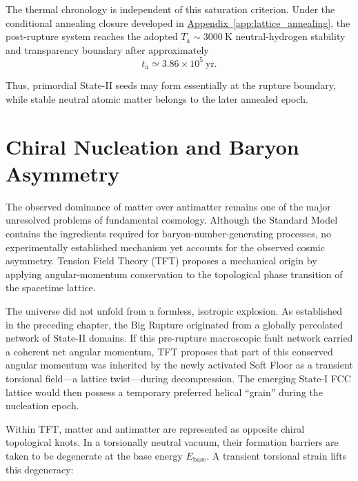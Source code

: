 The thermal chronology is independent of this saturation criterion. Under the conditional annealing closure developed in \hyperref[app:lattice_annealing]{Appendix~\ref*{app:lattice_annealing}}, the post-rupture system reaches the adopted \(T_{\mathrm a}\sim3000~\mathrm K\) neutral-hydrogen stability and transparency boundary after approximately
\begin{equation}
    t_{\mathrm a}
    \simeq
    3.86\times10^{5}\ \mathrm{yr}.
\end{equation}

Thus, primordial State-II seeds may form essentially at the rupture boundary, while stable neutral atomic matter belongs to the later annealed epoch.

\section{Chiral Nucleation and Baryon Asymmetry}

The observed dominance of matter over antimatter remains one of the major unresolved problems of fundamental cosmology. Although the Standard Model contains the ingredients required for baryon-number-generating processes, no experimentally established mechanism yet accounts for the observed cosmic asymmetry. Tension Field Theory (TFT) proposes a mechanical origin by applying angular-momentum conservation to the topological phase transition of the spacetime lattice.

The universe did not unfold from a formless, isotropic explosion. As established in the preceding chapter, the Big Rupture originated from a globally percolated network of State-II domains. If this pre-rupture macroscopic fault network carried a coherent net angular momentum, TFT proposes that part of this conserved angular momentum was inherited by the newly activated Soft Floor as a transient torsional field---a lattice twist---during decompression. The emerging State-I FCC lattice would then possess a temporary preferred helical ``grain'' during the nucleation epoch.

Within TFT, matter and antimatter are represented as opposite chiral topological knots. In a torsionally neutral vacuum, their formation barriers are taken to be degenerate at the base energy \(E_{\mathrm{base}}\). A transient torsional strain lifts this degeneracy:

